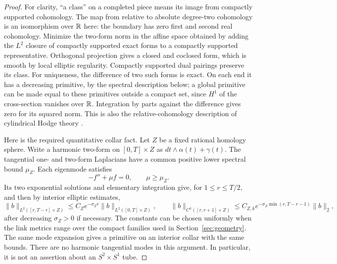 \begin{proof}
For clarity, ``a class'' on a completed piece means its image from
compactly supported cohomology.  The map from relative to absolute
degree-two cohomology is an isomorphism over $\mathbb R$ here: the boundary
has zero first and second real cohomology.  Minimize the two-form norm
in the affine space obtained by adding the $L^2$ closure of compactly
supported exact forms to a compactly supported representative.
Orthogonal projection gives a closed and coclosed form, which is smooth
by local elliptic regularity.  Compactly supported dual pairings
preserve its class.  For uniqueness, the difference of two such forms
is exact.  On each end it has a decreasing primitive, by the spectral
description below; a global primitive can be made equal to these
primitives outside a compact set, since $H^1$ of the cross-section
vanishes over $\mathbb R$.  Integration by parts against the difference gives
zero for its squared norm.  This is also the relative-cohomology
description of cylindrical Hodge theory
\cite[Proposition~4.9]{AtiyahPatodiSingerI}.

Here is the required quantitative collar fact.  Let $Z$ be a fixed
rational homology sphere.  Write a harmonic two-form on $[0,T]\times Z$
as $dt\wedge\alpha(t)+\gamma(t)$.  The tangential one- and two-form
Laplacians have a common positive lower spectral bound $\mu_Z$.
Each eigenmode satisfies
\[
        -f''+\mu f=0,\qquad \mu\geq\mu_Z.
\]
Its two exponential solutions and elementary integration give, for
$1\leq r\leq T/2$, and then by interior elliptic estimates,
\begin{equation}
 \|b\|_{L^2([r,T-r]\times Z)}
       \leq C_Ze^{-\sigma_Zr}\|b\|_{L^2([0,T]\times Z)},
 \qquad
 \|b\|_{C^k([r,r+1]\times Z)}
       \leq C_{Z,k}e^{-\sigma_Z\min(r,T-r-1)}\|b\|_2,
 \label{eq:estimates:rational-decay}
\end{equation}
after decreasing $\sigma_Z>0$ if necessary.  The constants can be
chosen uniformly when the link metrics range over the compact
families used in Section~\ref{sec:geometry}.  The same mode expansion
gives a primitive on an interior collar with the same bounds.  There
are no harmonic tangential modes in this argument.  In particular,
it is not an assertion about an $S^2\times S^1$ tube.


\end{proof}
